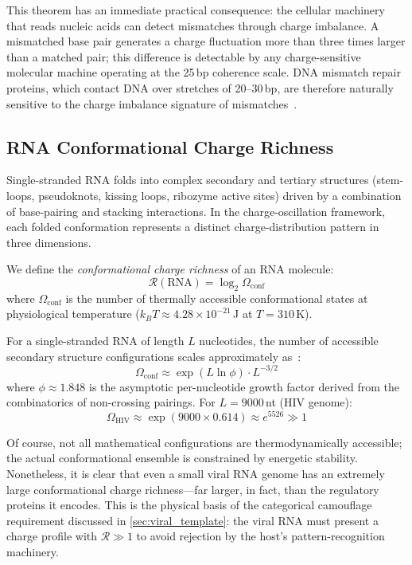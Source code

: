 \documentclass[11pt,twocolumn,a4paper]{article}
\theoremstyle{definition}
\theoremstyle{remark}
\newcommand{\Rcat}{\mathcal{R}}
\begin{document}
This theorem has an immediate practical consequence: the cellular machinery that reads nucleic acids can detect mismatches through charge imbalance. A mismatched base pair generates a charge fluctuation more than three times larger than a matched pair; this difference is detectable by any charge-sensitive molecular machine operating at the 25\,bp coherence scale. DNA mismatch repair proteins, which contact DNA over stretches of 20--30\,bp, are therefore naturally sensitive to the charge imbalance signature of mismatches~\cite{Erie2004,Modrich1994}.

\subsection{RNA Conformational Charge Richness}

Single-stranded RNA folds into complex secondary and tertiary structures (stem-loops, pseudoknots, kissing loops, ribozyme active sites) driven by a combination of base-pairing and stacking interactions. In the charge-oscillation framework, each folded conformation represents a distinct charge-distribution pattern in three dimensions.

We define the \emph{conformational charge richness} of an RNA molecule:
\begin{equation}
  \Rcat(\mathrm{RNA}) = \log_2 \Omega_{\mathrm{conf}}
  \label{eq:RNA_richness}
\end{equation}
where $\Omega_{\mathrm{conf}}$ is the number of thermally accessible conformational states at physiological temperature ($k_BT \approx 4.28 \times 10^{-21}$\,J at $T = 310$\,K).

For a single-stranded RNA of length $L$ nucleotides, the number of accessible secondary structure configurations scales approximately as~\cite{Waterman1978,Zuker1989}:
\begin{equation}
  \Omega_{\mathrm{conf}} \approx \exp(L \ln \phi) \cdot L^{-3/2}
\end{equation}
where $\phi \approx 1.848$ is the asymptotic per-nucleotide growth factor derived from the combinatorics of non-crossing pairings. For $L = 9000$\,nt (HIV genome):
\begin{equation}
  \Omega_{\mathrm{HIV}} \approx \exp(9000 \times 0.614) \approx e^{5526} \gg 1
\end{equation}

Of course, not all mathematical configurations are thermodynamically accessible; the actual conformational ensemble is constrained by energetic stability. Nonetheless, it is clear that even a small viral RNA genome has an extremely large conformational charge richness---far larger, in fact, than the regulatory proteins it encodes. This is the physical basis of the categorical camouflage requirement discussed in \cref{sec:viral_template}: the viral RNA must present a charge profile with $\Rcat \gg 1$ to avoid rejection by the host's pattern-recognition machinery.
\end{document}
